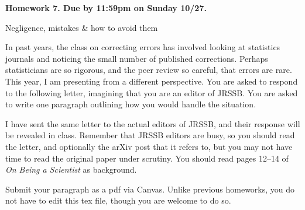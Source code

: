\documentclass[11pt]{article}
\begin{document}
\begin{center}{\bf
Homework 7. Due by 11:59pm on Sunday 10/27.

Negligence, mistakes \& how to avoid them

}\end{center}


In past years, the class on correcting errors has involved looking at statistics journals and noticing the small number of published corrections. Perhaps statisticians are so rigorous, and the peer review so careful, that errors are rare. This year, I am presenting from a different perspective. You are asked to respond to the following letter, imagining that you are an editor of JRSSB. You are asked to write one paragraph outlining how you would handle the situation.

I have sent the same letter to the actual editors of JRSSB, and their response will be revealed in class. Remember that JRSSB editors are busy, so you should read the letter, and optionally the arXiv post that it refers to, but you may not have time to read the original paper under scrutiny. You should read pages 12--14 of {\em On Being a Scientist} as background.

Submit your paragraph as a pdf via Canvas. Unlike previous homeworks, you do not have to edit this tex file, though you are welcome to do so.
\end{document}
